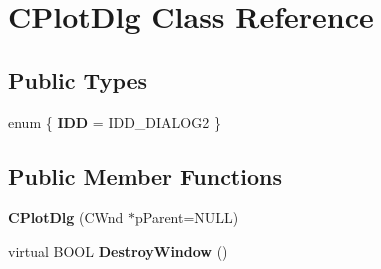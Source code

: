 \hypertarget{class_c_plot_dlg}{\section{C\-Plot\-Dlg Class Reference}
\label{class_c_plot_dlg}
}
\subsection*{Public Types}
\begin{DoxyCompactItemize}
\item 
enum \{ {\bfseries I\-D\-D} =  I\-D\-D\-\_\-\-D\-I\-A\-L\-O\-G2
 \}
\end{DoxyCompactItemize}
\subsection*{Public Member Functions}
\begin{DoxyCompactItemize}
\item 
\hypertarget{class_c_plot_dlg_a3a52a41497bbee1c26c2ffefedceeebd}{{\bfseries C\-Plot\-Dlg} (C\-Wnd $\ast$p\-Parent=N\-U\-L\-L)}\label{class_c_plot_dlg_a3a52a41497bbee1c26c2ffefedceeebd}

\item 
\hypertarget{class_c_plot_dlg_a01c0a3b57cc35cd93fd0aa6b57ee16dc}{virtual B\-O\-O\-L {\bfseries Destroy\-Window} ()}\label{class_c_plot_dlg_a01c0a3b57cc35cd93fd0aa6b57ee16dc}

\end{DoxyCompactItemize}
